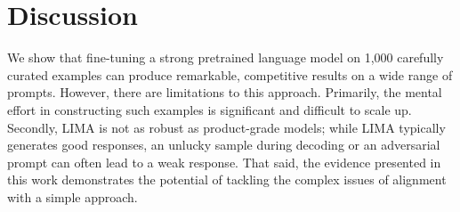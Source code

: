 \section{Discussion}

We show that fine-tuning a strong pretrained language model on 1,000 carefully curated examples can produce remarkable, competitive results on a wide range of prompts.
However, there are limitations to this approach.
Primarily, the mental effort in constructing such examples is significant and difficult to scale up.
Secondly, LIMA is not as robust as product-grade models; while LIMA typically generates good responses, an unlucky sample during decoding or an adversarial prompt can often lead to a weak response.
That said, the evidence presented in this work demonstrates the potential of tackling the complex issues of alignment with a simple approach.







